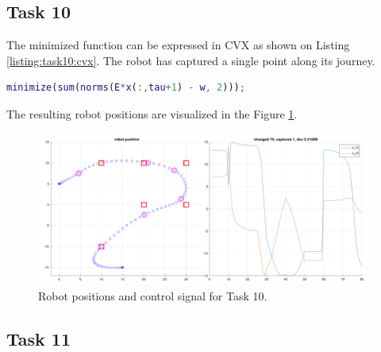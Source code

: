 \subsection {Task 10}

The minimized function can be expressed in CVX as shown on Listing \ref{listing:task10:cvx}. The robot has captured a single point along its journey.

\begin{lstlisting}[language=Matlab, caption=CVX code for task 10., label=listing:task10:cvx]
minimize(sum(norms(E*x(:,tau+1) - w, 2)));
\end{lstlisting}

The resulting robot positions are visualized in the Figure \ref{fig:task10:graph}.

\begin{figure}[!htb]
    \centering    
    \includegraphics[width=1\linewidth]{part1/figures/task_10.pdf}
    \caption{Robot positions and control signal for Task 10.}
    \label{fig:task10:graph}
\end{figure}

\clearpage
\subsection {Task 11}

